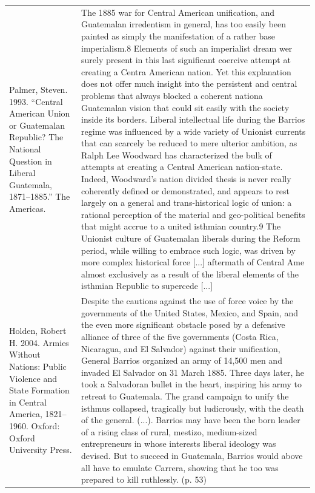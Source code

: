 {\begin{longtable}{p{}p{}}
Palmer, Steven. 1993. “Central American Union or Guatemalan Republic? The National Question in Liberal Guatemala, 1871–1885.” The Americas. & The 1885 war for Central American unification, and Guatemalan irredentism in general, has too easily been painted as simply the manifestation of a rather base imperialism.8 Elements of such an imperialist dream wer surely present in this last significant coercive attempt at creating a Centra American nation. Yet this explanation does not offer much insight into the persistent and central problems that always blocked a coherent nationa Guatemalan vision that could sit easily with the society inside its borders. Liberal intellectual life during the Barrios regime was influenced by a wide variety of Unionist currents that can scarcely be reduced to mere ulterior ambition, as Ralph Lee Woodward has characterized the bulk of attempts at creating a Central American nation-state. Indeed, Woodward's nation divided thesis is never really coherently defined or demonstrated, and appears to rest largely on a general and trans-historical logic of union: a rational perception of the material and geo-political benefits that might accrue to a united isthmian country.9 The Unionist culture of Guatemalan liberals during the Reform period, while willing to embrace such logic, was driven by more complex historical force [...] aftermath of Central Ame almost exclusively as a result of the liberal elements of the isthmian Republic to supercede [...]
\\
Holden, Robert H. 2004. Armies Without Nations: Public Violence and State Formation in Central America, 1821–1960. Oxford: Oxford University Press. & Despite the cautions against the use of force voice by the governments of the United States, Mexico, and Spain, and the even more significant obstacle posed by a defensive alliance of three of the five governments (Costa Rica, Nicaragua, and El Salvador) against their unification, General Barrios organized an army of 14,500 men and invaded El Salvador on 31 March 1885. Three days later, he took a Salvadoran bullet in the heart, inspiring his army to retreat to Guatemala. The grand campaign to unify the isthmus collapsed, tragically but ludicrously, with the death of the general. (...). Barrios may have been the born leader of a rising class of rural, mestizo, medium-sized entrepreneurs in whose interests liberal ideology was devised. But to succeed in Guatemala, Barrios would above all have to emulate Carrera, showing that he too was prepared to kill ruthlessly. (p. 53)
\\

\end{longtable}}
